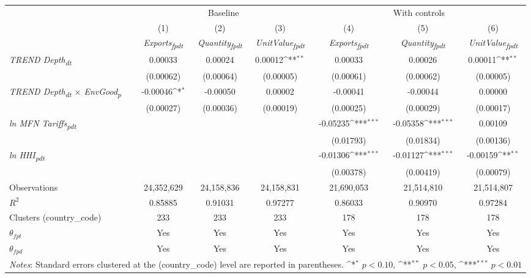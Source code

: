 {
\def\sym#1{\ifmmode^{#1}\else\(^{#1}\)\fi}
\begin{tabular}{l*{6}{c}}
\toprule
&\multicolumn{3}{c}{Baseline}&\multicolumn{3}{c}{With controls}\\\cmidrule(lr){2-4}\cmidrule(lr){5-7}
&(1)&(2)&(3)&(4)&(5)&(6)\\
&\textit{Exports\textsubscript{fpdt}}&\textit{Quantity\textsubscript{fpdt}}&\textit{UnitValue\textsubscript{fpdt}}&\textit{Exports\textsubscript{fpdt}}&\textit{Quantity\textsubscript{fpdt}}&\textit{UnitValue\textsubscript{fpdt}}\\
\midrule
\textit{TREND Depth\textsubscript{dt}} & 0.00033 & 0.00024 & 0.00012\sym{**} & 0.00033 & 0.00026 & 0.00011\sym{**}\\
 & (0.00062) & (0.00064) & (0.00005) & (0.00061) & (0.00062) & (0.00005)\\
\addlinespace
\textit{TREND Depth\textsubscript{dt} $\times$ EnvGood\textsubscript{p}} & -0.00046\sym{*} & -0.00050 & 0.00002 & -0.00041 & -0.00044 & 0.00000\\
 & (0.00027) & (0.00036) & (0.00019) & (0.00025) & (0.00029) & (0.00017)\\
\addlinespace
\textit{ln MFN Tariffs\textsubscript{pdt}} &  &  &  & -0.05235\sym{***} & -0.05358\sym{***} & 0.00109\\
 &  &  &  & (0.01793) & (0.01834) & (0.00136)\\
\addlinespace
\textit{ln HHI\textsubscript{pdt}} &  &  &  & -0.01306\sym{***} & -0.01127\sym{***} & -0.00159\sym{**}\\
 &  &  &  & (0.00378) & (0.00419) & (0.00079)\\
\midrule
Observations & 24,352,629 & 24,158,836 & 24,158,831 & 21,690,053 & 21,514,810 & 21,514,807\\
$R^{2}$ & 0.85885 & 0.91031 & 0.97277 & 0.86033 & 0.90970 & 0.97284\\
Clusters (country_code) & 233 & 233 & 233 & 178 & 178 & 178\\
$\theta_{fpt}$ & Yes & Yes & Yes & Yes & Yes & Yes\\
$\theta_{fpd}$ & Yes & Yes & Yes & Yes & Yes & Yes\\
\bottomrule
\multicolumn{7}{l}{\footnotesize \textit{Notes}: Standard errors clustered at the (country_code) level are reported in parentheses. \sym{*} \(p<0.10\), \sym{**} \(p<0.05\), \sym{***} \(p<0.01\)}\\
\end{tabular}
}
